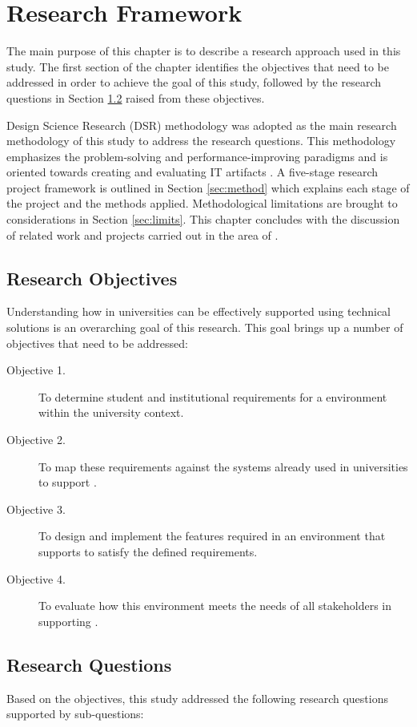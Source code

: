\chapter{Research Framework\label{cha:method}}

The main purpose of this chapter is to describe a research approach used in this
study. The first section of the chapter identifies the objectives that need to
be addressed in order to achieve the goal of this study, followed by the research
questions in Section \ref{sec:questions} raised from these objectives.

Design Science Research (DSR) methodology was adopted as the main research
methodology of this study to address the research questions. This methodology
emphasizes the problem-solving and performance-improving paradigms and is
oriented towards creating and evaluating IT artifacts \citep{Hevner2004}. A
five-stage research project framework is outlined in Section \ref{sec:method}
which explains each stage of the project and the methods applied. Methodological
limitations are brought to considerations in Section \ref{sec:limits}. This
chapter concludes with the discussion of related work and projects carried out
in the area of \LLLsn.

\section{Research Objectives}

Understanding how \LLLs in universities can be effectively supported using
technical solutions is an overarching goal of this research. This goal brings up
a number of objectives that need to be addressed:
\begin{description}
  \item[Objective 1.] To determine student and institutional requirements for a
  \LLLs environment within the university context.
  \item[Objective 2.] To map these requirements against the systems already used
  in universities to support \LLLsn.
  \item[Objective 3.] To design and implement the features required in an
  environment that supports \LLLs to satisfy the defined requirements.
  \item[Objective 4.] To evaluate how this environment meets the needs of all
  stakeholders in supporting \LLLsn.
\end{description}

\section{Research Questions}
\label{sec:questions}
Based on the objectives, this study addressed the following research questions
supported by sub-questions:

